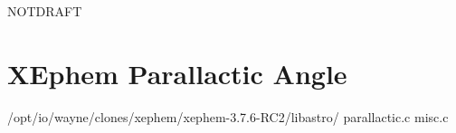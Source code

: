 \documentclass[letter,11pt,oneside]{article}
\def\documentisdraft{NOTDRAFT}
\begin{document}

\setcounter{section}{0}

\ifx\documentisdraft\drafttest
\linenumbers    %
\fi

\section{XEphem Parallactic Angle}




/opt/io/wayne/clones/xephem/xephem-3.7.6-RC2/libastro/
parallactic.c
misc.c

\begingroup \fontsize{10pt}{10pt}
\selectfont
\end{document}
